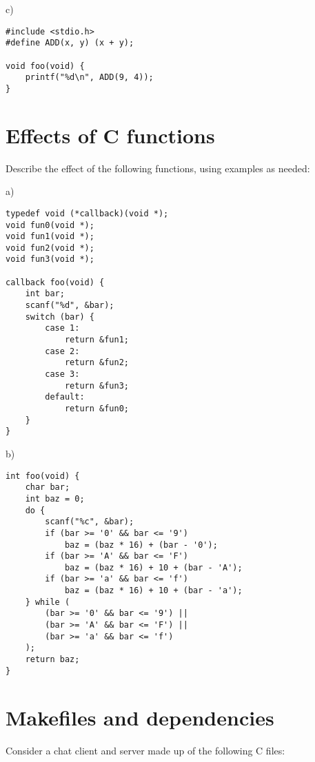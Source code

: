 \documentclass[a4paper,12pt]{article}
\begin{document}
c) %

\begin{lstlisting}
#include <stdio.h>
#define ADD(x, y) (x + y);

void foo(void) {
	printf("%d\n", ADD(9, 4));
}
\end{lstlisting}

\newpage

\section{Effects of C functions}

Describe the effect of the following functions, using examples as
needed:

a)

\begin{lstlisting}
typedef void (*callback)(void *);
void fun0(void *);
void fun1(void *);
void fun2(void *);
void fun3(void *);

callback foo(void) {
	int bar;
	scanf("%d", &bar);
	switch (bar) {
		case 1:
			return &fun1;
		case 2:
			return &fun2;
		case 3:
			return &fun3;
		default:
			return &fun0;
	}
}
\end{lstlisting}

b)

\begin{lstlisting}
int foo(void) {
	char bar;
	int baz = 0;
	do {
		scanf("%c", &bar);
		if (bar >= '0' && bar <= '9')
			baz = (baz * 16) + (bar - '0');
		if (bar >= 'A' && bar <= 'F')
			baz = (baz * 16) + 10 + (bar - 'A');
		if (bar >= 'a' && bar <= 'f')
			baz = (baz * 16) + 10 + (bar - 'a');
	} while (
		(bar >= '0' && bar <= '9') ||
		(bar >= 'A' && bar <= 'F') ||
		(bar >= 'a' && bar <= 'f')
	);
	return baz;
}
\end{lstlisting}

\newpage

\section{Makefiles and dependencies}

Consider a chat client and server made up of the following C files:
\end{document}
